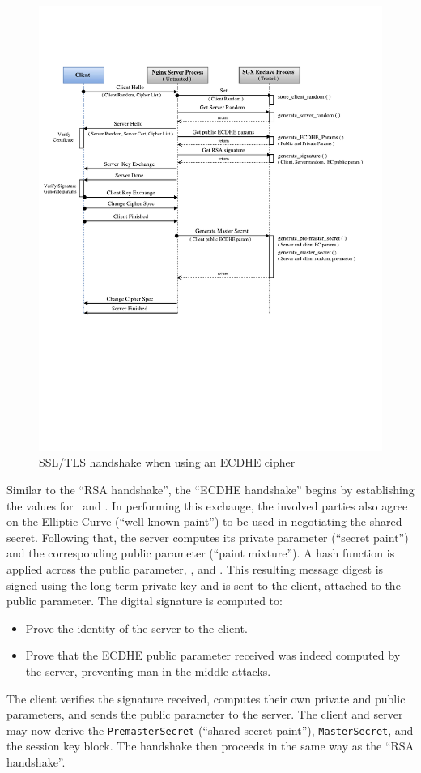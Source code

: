 \documentclass[../../main.tex]{subfiles}
\begin{document}
\begin{figure}[H]
  \centering
  \includegraphics[scale=0.4]{images/EC-DHE-Handshake-pristine.pdf}
  \caption[``ECDHE handshake'']{SSL/TLS handshake when using an ECDHE
    cipher}
  \label{fig:ecdhe-pristine}
\end{figure}

Similar to the ``RSA handshake'', the ``ECDHE handshake'' begins by
establishing the values for \crandom~and \srandom. In performing this
exchange, the involved parties also agree on the Elliptic Curve
(``well-known paint'') to be used in negotiating the shared secret.
Following that, the server computes its private parameter (``secret
paint'') and the corresponding public parameter (``paint mixture''). A
hash function is applied across the public parameter, \srandom, and
\crandom. This resulting message digest is signed using the long-term
private key and is sent to the client, attached to the public
parameter. The digital signature is computed to:
\begin{itemize}
  \item Prove the identity of the server to the client.
  \item Prove that the ECDHE public parameter received was indeed
    computed by the server, preventing man in the middle attacks. 
\end{itemize}
The client verifies the signature received, computes their own private
and public parameters, and sends the public parameter to the server.
The client and server may now derive the \texttt{PremasterSecret}
(``shared secret paint''), \texttt{MasterSecret}, and the session key
block. The handshake then proceeds in the same way as the ``RSA
handshake''.
\end{document}
